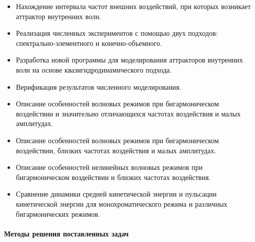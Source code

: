 \documentclass[utf8x]{G7-32} %
\begin{document}
\begin{itemize}

  \item Нахождение интервала частот внешних воздействий, при которых возникает аттрактор внутренних волн.
  

    
    
  \item Реализация численных экспериментов с помощью двух подходов: спектрально-элементного и конечно-объемного.

  \item Разработка новой программы для моделирования аттракторов внутренних волн на основе квазигидродинамического подхода.
    
  \item Верификация результатов численного моделирования.

  \item Описание особенностей волновых режимов при бигармоническом воздействии и значительно отличающихся частотах воздействия и малых амплитудах.

  \item Описание особенностей волновых режимов при бигармоническом воздействии, близких частотах воздействия и малых амплитудах.
    
  \item Описание особенностей нелинейных волновых режимов при бигармоническом воздействии и близких частотах воздействия.

  \item Сравнение динамики средней кинетической энергии и пульсации кинетической энергии для монохроматического режима и различных бигармонических режимов.
    

    
\end{itemize}

\paragraph{Методы решения поставленных задач}
\end{document}
